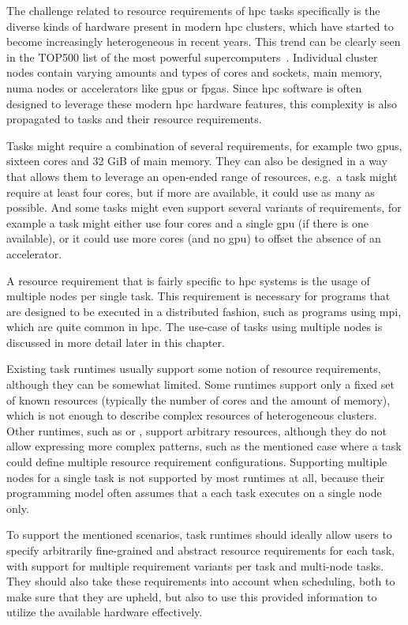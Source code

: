 The challenge related to resource requirements of \gls{hpc} tasks specifically is
the diverse kinds of hardware present in modern \gls{hpc} clusters, which have
started to become increasingly heterogeneous in recent years. This trend can be clearly seen in the
TOP500 list of the most powerful supercomputers~\cite{top500analysis}. Individual cluster
nodes contain varying amounts and types of cores and sockets, main memory,
\gls{numa} nodes or accelerators like \glspl{gpu} or
\glspl{fpga}. Since \gls{hpc} software is often designed to
leverage these modern \gls{hpc} hardware features, this complexity is also
propagated to tasks and their resource requirements.

Tasks might require a combination of several requirements, for example two
\glspl{gpu}, sixteen cores and 32 GiB of main memory. They can also be designed in
a way that allows them to leverage an open-ended range of resources, e.g.\ a task might require at
least four cores, but if more are available, it could use as many as possible. And some tasks might
even support several variants of requirements, for example a task might either use four cores and a
single \gls{gpu} (if there is one available), or it could use more cores (and no \gls{gpu})
to offset the absence of an accelerator.

A resource requirement that is fairly specific to \gls{hpc} systems is the usage
of multiple nodes per single task. This requirement is necessary for programs that are designed to
be executed in a distributed fashion, such as programs using \gls{mpi}, which are
quite common in \gls{hpc}. The use-case of tasks using multiple nodes is
discussed in more detail later in this chapter.

Existing task runtimes usually support some notion of resource requirements, although they can be
somewhat limited. Some runtimes support only a fixed set of known resources (typically the number
of cores and the amount of memory), which is not enough to describe complex resources of
heterogeneous clusters. Other runtimes, such as \dask{} or
\snakemake{}, support arbitrary resources, although they do not allow expressing
more complex patterns, such as the mentioned case where a task could define multiple resource
requirement configurations. Supporting multiple nodes for a single task is not supported by most
runtimes at all, because their programming model often assumes that a each task executes on a
single node only.

To support the mentioned scenarios, task runtimes should ideally allow users to specify arbitrarily
fine-grained and abstract resource requirements for each task, with support for multiple
requirement variants per task and multi-node tasks. They should also take these requirements into
account when scheduling, both to make sure that they are upheld, but also to use this provided
information to utilize the available hardware effectively.

